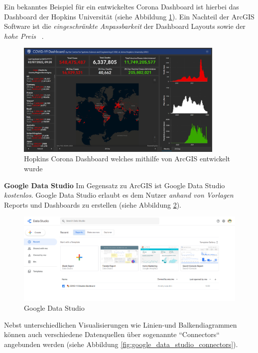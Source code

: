 Ein bekanntes Beispiel für ein entwickeltes Corona Dashboard ist hierbei das Dashboard der Hopkins Universität (siehe Abbildung \ref{fig:arcgis_hopkins_dashboard}). Ein Nachteil der ArcGIS Software ist die \textit{eingeschränkte Anpassbarkeit} der Dashboard Layouts sowie der \textit{hohe Preis} ~\citep{arcgis_comparison}.


\begin{figure}[h]
    \includegraphics[width=10cm]{images/arcgis_hopkins_dashboard.png}
    \centering
    \caption{Hopkins Corona Dashboard welches mithilfe von ArcGIS entwickelt wurde ~\citep{arcgis_hopkins_dashboard}}
    \label{fig:arcgis_hopkins_dashboard}
\end{figure}


\clearpage
\textbf{Google Data Studio}
\newline
Im Gegensatz zu ArcGIS ist Google Data Studio \textit{kostenlos}. Google Data Studio erlaubt es dem Nutzer \textit{anhand von Vorlagen} Reports und Dashboards zu erstellen (siehe Abbildung \ref{fig:google_data_studio}).

\begin{figure}[h]
    \includegraphics[width=12cm]{images/google_data_studio.png}
    \centering
    \caption{Google Data Studio ~\citep{google_data_studio}}
    \label{fig:google_data_studio}
\end{figure}

Nebst unterschiedlichen Visualisierungen wie Linien-und Balkendiagrammen können auch verschiedene Datenquellen über sogenannte ``Connectors`` angebunden werden (siehe Abbildung \ref{fig:google_data_studio_connectors}).

